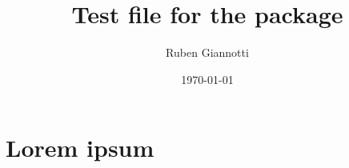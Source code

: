 \documentclass{article}
\title{Test file for the \pkg{stealcaps} package}
\author{Ruben Giannotti}
\date{\today}
\begin{document}
\maketitle

\section{Lorem ipsum}

\lipsum[3]
\end{document}
